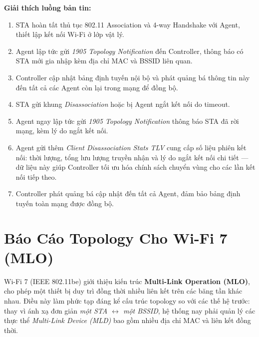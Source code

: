 \textbf{Giải thích luồng bản tin:}
\begin{enumerate}
	\item STA hoàn tất thủ tục 802.11 Association và 4-way Handshake với Agent, thiết
	lập kết nối Wi-Fi ở lớp vật lý.
	\item Agent lập tức gửi \textit{1905 Topology Notification} đến Controller, thông
	báo có STA mới gia nhập kèm địa chỉ MAC và BSSID liên quan.
	\item Controller cập nhật bảng định tuyến nội bộ và phát quảng bá thông tin này
	đến tất cả các Agent còn lại trong mạng để đồng bộ.
	\item STA gửi khung \textit{Disassociation} hoặc bị Agent ngắt kết nối do timeout.
	\item Agent ngay lập tức gửi \textit{1905 Topology Notification} thông báo STA đã
	rời mạng, kèm lý do ngắt kết nối.
	\item Agent gửi thêm \textit{Client Disassociation Stats TLV} cung cấp số liệu
	phiên kết nối: thời lượng, tổng lưu lượng truyền nhận và lý do ngắt kết nối
	chi tiết --- dữ liệu này giúp Controller tối ưu hóa chính sách chuyển vùng
	cho các lần kết nối tiếp theo.
	\item Controller phát quảng bá cập nhật đến tất cả Agent, đảm bảo bảng định tuyến
	toàn mạng được đồng bộ.
\end{enumerate}


\section{Báo Cáo Topology Cho Wi-Fi 7 (MLO)}

Wi-Fi 7 (IEEE 802.11be) giới thiệu kiến trúc \textbf{Multi-Link Operation (MLO)}, cho
phép một thiết bị duy trì đồng thời nhiều liên kết trên các băng tần khác nhau. Điều
này làm phức tạp đáng kể cấu trúc topology so với các thế hệ trước: thay vì ánh xạ
đơn giản \textit{một STA $\leftrightarrow$ một BSSID}, hệ thống nay phải quản lý các
thực thể \textit{Multi-Link Device (MLD)} bao gồm nhiều địa chỉ MAC và liên kết
đồng thời.

